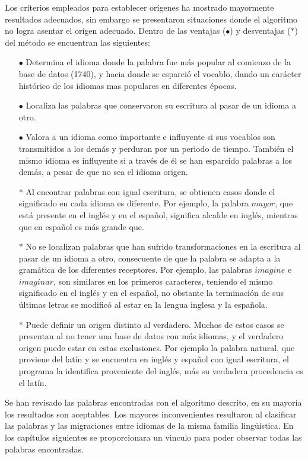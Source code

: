 Los criterios empleados para establecer orígenes ha mostrado mayormente
resultados adecuados, sin embargo se presentaron situaciones donde el algoritmo
no logra asentar el origen adecuado. Dentro de las ventajas ($\bullet$) y
desventajas ($\ast$) del método se encuentran las siguientes:
\begin{itemize}
\item [$\bullet$] 
Determina el idioma donde la palabra fue más popular al comienzo de
la base de datos (1740), y hacia donde se esparció el vocablo, dando un
carácter histórico de los idiomas mas populares en diferentes épocas. 
\item [$\bullet$] 
Localiza las palabras que conservaron su escritura al pasar de un
idioma a otro. 
\item [$\bullet$] 
Valora a un idioma como importante e influyente si sus vocablos son
transmitidos a los demás y perduran por un periodo de tiempo. También el mismo
idioma es influyente si a través de él se han esparcido palabras a los demás, a
pesar de que no sea el idioma origen. 
\item [$\ast$] Al encontrar palabras con igual escritura, se obtienen casos donde
el significado en cada idioma es diferente.  Por ejemplo, la palabra
$\textit{mayor}$, que está presente en el inglés y en el español,  significa
alcalde en inglés, mientras que en español es más grande que.
\item [$\ast$]
No se localizan palabras que han sufrido transformaciones en la
escritura al pasar de un idioma a otro, consecuente de que la palabra se adapta
a la gramática de los diferentes receptores.  Por ejemplo, las palabras
$\textit{imagine}$ e $\textit{imaginar}$, son similares en los primeros
caracteres, teniendo el mismo significado en el inglés y en el español, no
obstante la terminación de  sus últimas letras se modificó al estar en  la
lengua inglesa y la española. 
\item [$\ast$]
 Puede definir un origen distinto al verdadero.  Muchos de estos casos se
presentan al no tener una base de datos con más idiomas, y el verdadero origen
puede estar en estas exclusiones. Por ejemplo la palabra natural, que proviene
del latín y se encuentra en inglés y español con igual escritura,  el programa
la identifica proveniente del inglés, más su verdadera procedencia es el latín. 
\end{itemize}

Se han revisado las palabras encontradas con el algoritmo descrito, en su
mayoría los resultados son aceptables. Los mayores inconvenientes resultaron al
clasificar las palabras y las migraciones entre idiomas de la misma familia
lingüística.  En los capítulos siguientes se proporcionara un vinculo para
poder observar todas las palabras encontradas.


